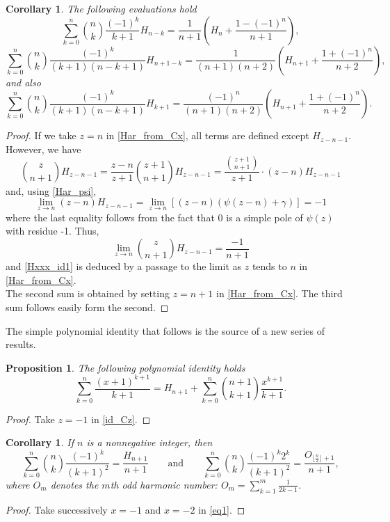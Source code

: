 \documentclass[10pt,a4paper]{amsart}
\numberwithin{equation}{section}
\newtheorem{proposition}[thm]{Proposition}
\newtheorem{corollary}[thm]{Corollary}
\begin{document}
\begin{corollary}
The following evaluations hold
\begin{equation}\label{Hxxx_id1}
\sum_{k=0}^n \binom{n}{k} \frac{(-1)^k}{k+1} H_{n-k} = \frac{1}{n+1}\left ( H_n + \frac{1-(-1)^n}{n+1}\right ),
\end{equation}
\begin{equation}\label{Hxxx_id2}
\sum_{k=0}^n \binom{n}{k} \frac{(-1)^k}{(k+1)(n-k+1)} H_{n+1-k} = \frac{1}{(n+1)(n+2)}\left ( H_{n+1} + \frac{1+(-1)^n}{n+2}\right ),
\end{equation}
and also
\begin{equation}\label{Hxxx_id3}
\sum_{k=0}^n \binom{n}{k} \frac{(-1)^k}{(k+1)(n-k+1)} H_{k+1} = \frac{(-1)^n}{(n+1)(n+2)}\left ( H_{n+1} + \frac{1+(-1)^n}{n+2}\right ).
\end{equation}
\end{corollary}
\begin{proof}
If we take $z=n$ in \eqref{Har_from_Cx}, all terms are defined except $H_{z-n-1}$. However, we have
\[\binom{z}{n+1}H_{z-n-1}=\frac{z-n}{z+1}\binom{z+1}{n+1}H_{z-n-1}=\frac{\binom{z+1}{n+1}}{z+1}\cdot (z-n)H_{z-n-1}\]
and, using \eqref{Har_psi},
\[\lim_{z\to n} (z-n)H_{z-n-1}=\lim_{z\to n} [(z-n)(\psi(z-n)+\gamma)]=-1\]
where the last equality follows from the fact that $0$ is a simple pole of $\psi(z)$ with residue -1. Thus, 
\[\lim_{z\to n}\binom{z}{n+1}H_{z-n-1}=\frac{-1}{n+1}\]
and \eqref{Hxxx_id1} is deduced by a passage to the limit as $z$ tends to $n$ in \eqref{Har_from_Cx}.\\
The second sum is obtained by setting $z=n+1$ in \eqref{Har_from_Cx}. The third sum follows easily form the second.
\end{proof}

The simple polynomial identity that follows is the source of a new series of results.

\begin{proposition}
The following polynomial identity holds
\begin{equation}\label{eq1}
\sum_{k=0}^n \frac{(x+1)^{k+1}}{k+1} = H_{n+1} + \sum_{k=0}^n \binom{n+1}{k+1} \frac{x^{k+1}}{k+1}.
\end{equation}
\end{proposition}
\begin{proof}
Take $z=-1$ in \eqref{id_Cz}.
\end{proof}

\begin{corollary}
If $n$ is a nonnegative integer, then
\begin{equation}\label{eq 5}
\sum_{k=0}^n \binom{n}{k} \frac{(-1)^k}{(k+1)^2} = \frac{H_{n+1}}{n+1} \qquad\mbox{and}\qquad 
\sum_{k=0}^n \binom{n}{k} \frac{(-1)^k 2^k}{(k+1)^2} = \frac{O_{\lfloor{\frac{n}{2}}\rfloor+1}}{n+1},
\end{equation}
where $O_m$ denotes the $m$th odd harmonic number: $O_m=\sum_{k=1}^m\frac{1}{2k-1}$.
\end{corollary}
\begin{proof}
Take successively $x=-1$ and $x=-2$ in \eqref{eq1}.
\end{proof}
\end{document}
